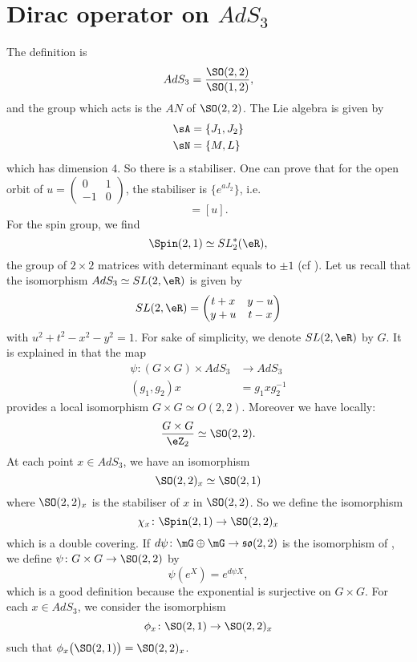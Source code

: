 
\section{Dirac operator on \texorpdfstring{$AdS_{3}$}{AdS3}}  \label{PgDiracAdSTrois}

The definition is
\[
  AdS_{3}=\frac{ \SO(2,2) }{ \SO(1,2) },
\]
and the group which acts is the $AN$ of $\SO(2,2)$. The Lie algebra is given by
\[
\begin{split}
  \sA&=\{ J_{1},J_{2} \}\\
  \sN&=\{ M,L \}
\end{split}
\]
which has dimension $4$. So there is a stabiliser. One can prove that for the open orbit of $u=\begin{pmatrix}
0&1\\-1&0
\end{pmatrix}$, the stabiliser is $\{  e^{aJ_{2}} \}$, i.e.
\begin{equation}
  [ e^{aJ_{2}}u]=[u].
\end{equation}
For the spin group, we find
\[
  \Spin(2,1)\simeq SL_2^*(\eR),
\]
the group of $2\times 2$ matrices with determinant equals to $\pm 1$ (cf \cite{Michelson}). Let us recall that the isomorphism $AdS_{3}\simeq SL(2,\eR)$ is given by
\[ 
  SL(2,\eR)=\begin{pmatrix}
t+x&y-u\\
y+u&t-x
\end{pmatrix}
\]
with $u^{2}+t^{2}-x^{2}-y^{2}=1$. For sake of simplicity, we denote $SL(2,\eR)$ by $G$. It is explained in \cite{Clement} that the map
\begin{equation}
\begin{aligned}
 \psi\colon (G\times G)\times AdS_{3}&\to AdS_3 \\
(g_{1},g_{2})x&= g_{1}xg_{2}^{-1}
\end{aligned}
\end{equation}
provides a local isomorphism $G\times G\simeq O(2,2)$. Moreover we have locally:
\[
  \frac{ G\times G }{ \eZ_{2} }\simeq \SO(2,2).
\]
At each point $x\in AdS_3$, we have an isomorphism
\[
  \SO(2,2)_{x}\simeq \SO(2,1)
\]
where $\SO(2,2)_{x}$ is the stabiliser of $x$ in $\SO(2,2)$. So we define the isomorphism
\[
  \chi_{x}\colon \Spin(2,1)\to \SO(2,2)_{x}
\]
which is a double covering. If $d\psi\colon \mG\oplus\mG\to \mathfrak{so}(2,2)$ is the isomorphism of \cite{Clement}, we define $\psi\colon G\times G\to \SO(2,2)$ by
\[
  \psi( e^{X})= e^{d\psi X},
\]
which is a good definition because the exponential is surjective on $G\times G$. For each $x\in AdS_3$, we consider the isomorphism
\[
  \phi_{x}\colon \SO(2,1)\to \SO(2,2)_{x}
\]
such that $\phi_{x}\big( \SO(2,1) \big)=\SO(2,2)_{x}$.

